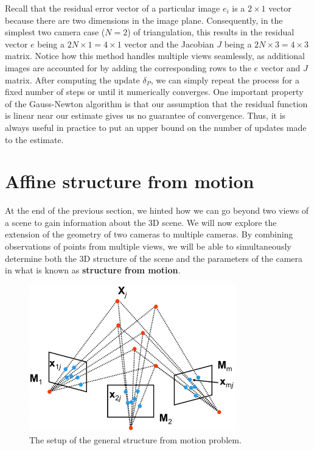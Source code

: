 \documentclass[a4paper, 12pt]{article}
\renewcommand\emph{\textbf}
\numberwithin{equation}{section}
\begin{document}
 Recall that the residual error vector of a particular image $e_i$ is a $2\times 1$ vector because there are two dimensions in the image plane. Consequently, in the simplest two camera case ($N=2$) of triangulation, this results in the residual vector $e$ being a $2N\times1 = 4\times1$ vector and the Jacobian $J$ being a $2N\times3 =4 \times 3$ matrix. Notice how this method handles multiple views seamlessly, as additional images are accounted for by adding the corresponding rows to the $e$ vector and $J$ matrix. After computing the update $\delta_P$, we can simply repeat the process for a fixed number of steps or until it numerically converges. One important property of the Gauss-Newton algorithm is that our assumption that the residual function is linear near our estimate gives us no guarantee of convergence. Thus, it is always useful in practice to put an upper bound on the number of updates made to the estimate.

\section{Affine structure from motion}
At the end of the previous section, we hinted how we can go beyond two views of a scene to gain information about the 3D scene. We will now explore the extension of the geometry of two cameras to multiple cameras. By combining observations of points from multiple views, we will be able to simultaneously determine both the 3D structure of the scene and the parameters of the camera in what is known as \emph{structure from motion}.

\begin{figure}[h!]
\centering
\includegraphics[width=0.8\textwidth]{figures/sfm_setup.png}
\caption{The setup of the general structure from motion problem.}
\label{fig:sfm_setup}
\end{figure}
\end{document}
